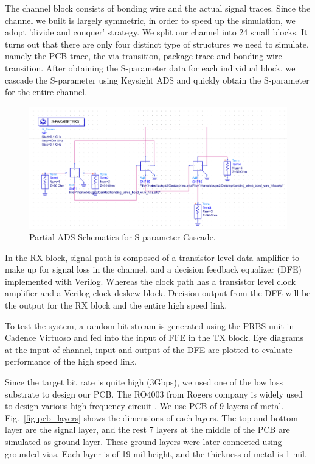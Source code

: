 \documentclass{book}  %
\renewcommand{\section}[1]{\psection{#1}}
\begin{document}
\begin{paper}
The channel block consists of bonding wire and the actual signal traces. Since the channel we built is largely symmetric, in order to speed up the simulation, we adopt 'divide and conquer' strategy. We split our channel into 24 small blocks. It turns out that there are only four distinct type of structures we need to simulate, namely the PCB trace, the via transition, package trace and bonding wire transition. After obtaining the S-parameter data for each individual block, we cascade the S-parameter using Keysight ADS and quickly obtain the S-parameter for the entire channel. 

\begin{figure}[htbp!]
	\centering
	\includegraphics[width=0.8\columnwidth]{./img/cascade_schematics.png}
	\caption{Partial ADS Schematics for S-parameter Cascade.}
\end{figure}

In the RX block, signal path is composed of a transistor level data amplifier to make up for signal loss in the channel, and a decision feedback equalizer (DFE) implemented with Verilog. Whereas the clock path has a transistor level clock amplifier and a Verilog clock deskew block. Decision output from the DFE will be the output for the RX block and the entire high speed link.

To test the system, a random bit stream is generated using the PRBS unit in Cadence Virtuoso and fed into the input of FFE in the TX block. Eye diagrams at the input of channel, input and output of the DFE are plotted to evaluate performance of the high speed link.


\section{Channel Design}
\label{sec:channel_design}

Since the target bit rate is quite high (3Gbps), we used one of the low loss substrate to design our PCB. The RO4003 from Rogers company is widely used to design various high frequency circuit \cite{na_ro4003_rogers}. We use PCB of 9 layers of metal. Fig.~\ref{fig:pcb_layers} shows the dimensions of each layers. The top and bottom layer are the signal layer, and the rest 7 layers at the middle of the PCB are simulated as ground layer. These ground layers were later connected using grounded vias. Each layer is of 19 mil height, and the thickness of metal is 1 mil. \\


\end{paper}
\end{document}
